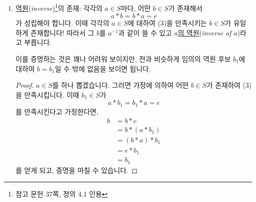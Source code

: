 \documentclass[12pt]{paper}
\begin{document}
\begin{enumerate}
    이렇게만 해도 충분한 이유를 생각해 봅시다.
    $e_1 \in S$이 $e$와 다르다면 항등원이어서는 안 된다는 걸 보이면,
    자동적으로 항등원은 $e$ 밖에 없게 됩니다.
    그런데 ``$e_1 \in S$이 $e$와 다르다면 항등원이서는 안 된다''의 대우 명제가 바로 ``$e_1 \in S$가 (2-1)을 만족시킨다면 $e = e_1$이다''이기 때문입니다.
    이제 본격적으로 증명을 해보도록 하겠습니다.

    \begin{proof}
      먼저, $e_1 \in S$를 하나 잡은 뒤 그 $e_1$이 (2-1)을 만족시킨다고 가정하겠습니다.
      그러면 (2)의 $a$ 자리에 $e_1$을 넣음으로써 $$e * e_1 = e_1 * e = e_1$$을 얻을 수 있고,
      (2-1)의 $a$ 자리에 $e$를 넣음으로써 $$e_1 * e = e * e_1 = e$$을 얻을 수 있습니다.
      따라서 $e_1 * e = e_1$이고 $e_1 * e = e$임을 알 수 있습니다.
      이것들로부터 $$e = e_1 * e = e_1$$를 얻게 되는데,
      이로써 ($e = e_1$을 보였기 때문에) 증명을 마칠 수 있습니다.
    \end{proof}

    \item \underline{역원}(\textit{inverse})\footnote{참고 문헌 \cite{fraleigh2009} 37쪽, 정의 4.1 인용}의 존재:
    각각의 $a \in S$마다, 어떤 $b \in S$가 존재해서
    \begin{equation*}
      a * b = b * a = e \tag{3}
    \end{equation*}
    가 성립해야 합니다.
    이때 각각의 $a \in S$에 대하여 (3)을 만족시키는 $b \in S$가 유일하게 존재합니다!
    따라서 그 $b$를 $a^{-1}$과 같이 쓸 수 있고 \underline{$a$의 역원}(\textit{inverse of $a$})라고 부릅니다.

    이를 증명하는 것은 꽤나 어려워 보이지만,
    전과 비슷하게 임의의 역원 후보 $b_1$에 대하여 $b = b_1$일 수 밖에 없음을 보이면 됩니다.

    \begin{proof}
      $a \in S$를 하나 뽑겠습니다.
      그러면 가정에 의하여 어떤 $b \in S$가 존재하여 (3)을 만족시킵니다.
      이때 $b_1 \in S$가
      \begin{equation*}
        a * b_1 = b_1 * a = e \tag{3-1}
      \end{equation*}
      를 만족시킨다고 가정한다면,
      \begin{align*}
        b
        & = b * e \tag{2} \\
        & = b * (a * b_1) \tag{3-1} \\
        & = (b * a) * b_1 \tag{1} \\
        & = e * b_1 \tag{3} \\
        & = b_1 \tag{2}
      \end{align*}
      를 얻게 되고,
      증명을 마칠 수 있습니다.
    \end{proof}
  \end{enumerate}
\end{document}
